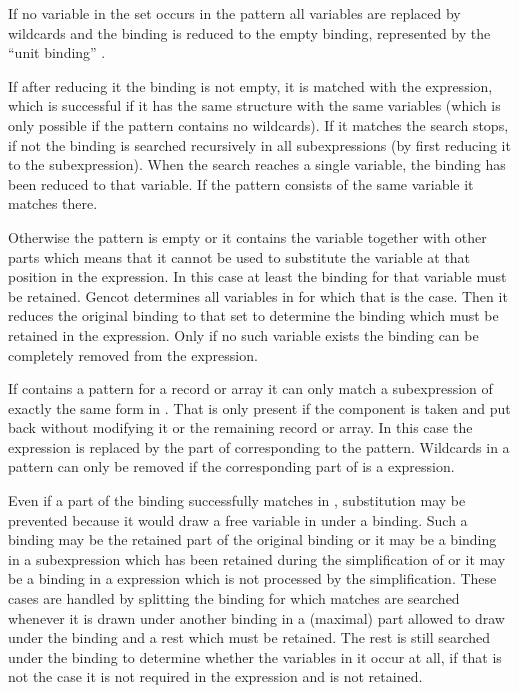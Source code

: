 If no variable in the set occurs in the pattern all variables are replaced by wildcards and the binding is reduced to the 
empty binding, represented by the ``unit binding'' \code{() = ()}.

If after reducing it the binding is not empty, it is matched with the expression, which is successful if it has the same structure with the same
variables (which is only possible if the pattern contains no wildcards). If it matches the search stops, if not the binding 
is searched recursively in all subexpressions (by first reducing it to the subexpression). When the search reaches a single 
variable, the binding has been reduced to that variable. If the pattern consists of the same variable it matches there.

Otherwise the pattern is empty or it contains the variable together with other parts which means that it cannot be used to substitute the 
variable at that position in the expression. In this case at least the binding for that variable must be retained. Gencot 
determines all variables in  for which that is the case. Then it reduces the original binding 
to that set to determine the binding  which must be retained in the  expression. Only if no
such variable exists the binding can be completely removed from the  expression.

If  contains a  pattern for a record or array it can only match a  subexpression 
of exactly the same form in . That is only present if the component is taken and put back without modifying it or the 
remaining record or array. In this case the  expression is replaced by the part of  corresponding to 
the  pattern. Wildcards in a  pattern can only be removed if the corresponding part of 
is a  expression.

Even if a part of the binding successfully matches in , substitution may be prevented because it would draw a 
free variable in  under a binding. Such a binding may be the retained part of the original binding or it may 
be a binding in a  subexpression which has been retained during the simplification of 
or it may be a binding in a  expression which is not processed by the simplification. These cases are handled
by splitting the binding for which matches are searched whenever it is drawn under another binding in a (maximal) part allowed
to draw under the binding and a rest which must be retained. The rest is still searched under the binding to determine whether
the variables in it occur at all, if that is not the case it is not required in the expression and is not retained.

